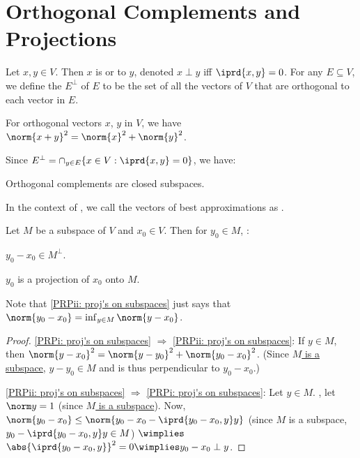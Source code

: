 	
	
	
\section{Orthogonal Complements and Projections}

	Let $x, y\in V$. Then $x$ is \stb {} or  to $y$, denoted $x\perp y$ iff $\iprd{x, y} = 0$. For any $E\subseteq V$, we define the  $E^\perp$ of $E$ to be the set of all the vectors of $V$ that are orthogonal to each vector in $E$.
	
	\begin{lem}[Pythagoras]
		For orthogonal vectors $x$, $y$ in $V$, we have $\norm{x + y}^2 = \norm{x}^2 + \norm{y}^2$.
	\end{lem}
	
	Since $E^\perp = \cap_{y\in E}\{x\in V : \iprd{x, y} = 0\}$, we have:
	
	\begin{lem}
		Orthogonal complements are closed subspaces.
	\end{lem}
	
	In the context of , we call the vectors of best approximations as .
	
	\begin{prp}\label{PRP: proj's on subspaces}
		Let $M$ be a subspace of $V$ and $x_0\in V$. Then for $y_0\in M$, \tfae:
		\begin{mylist}
			\item\label{PRPi: proj's on subspaces} $y_0 - x_0\in M^\perp$.
			\item\label{PRPii: proj's on subspaces} $y_0$ is a projection of $x_0$ onto $M$.
		\end{mylist}
	\end{prp}
	
	Note that \ref{PRPii: proj's on subspaces} just says that $\norm{y_0 - x_0} = \inf_{y\in M} \norm{y - x_0}$.
	
	\begin{proof}
		\ref{PRPi: proj's on subspaces} $\Rightarrow$ \ref{PRPii: proj's on subspaces}: If $y\in M$, then $\norm{y - x_0}^2 = \norm{y - y_0}^2 + \norm{y_0 - x_0}^2$. (Since \uline{$M$ is a subspace}, $y - y_0\in M$ and is thus perpendicular to $y_0 - x_0$.)
		
		\ref{PRPii: proj's on subspaces} $\Rightarrow$ \ref{PRPi: proj's on subspaces}: Let $y\in M$. \Wlogg, let $\norm y = 1$ (since \uline{$M$ is a subspace}). Now, $\norm{y_0 - x_0}\le \norm{y_0 - x_0 - \iprd{y_0 - x_0, y} y}$ (since $M$ is a subspace, $y_0 - \iprd{y_0 - x_0, y} y\in M$) $\wimplies$ $\abs{\iprd{y_0 - x_0, y}}^2 = 0\wimplies y_0 - x_0\perp y$.
	\end{proof}
	
